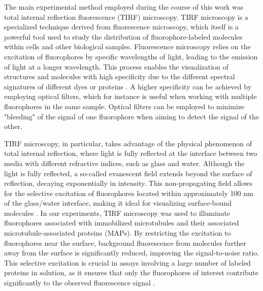 The main experimental method employed during the course of this work was total internal reflection fluorescence (TIRF) microscopy. TIRF microscopy is a specialized technique derived from fluorescence microscopy, which itself is a powerful tool used to study the distribution of fluorophore-labeled molecules within cells and other biological samples. Fluorescence microscopy relies on the excitation of fluorophores by specific wavelengths of light, leading to the emission of light at a longer wavelength. This process enables the visualization of structures and molecules with high specificity due to the different spectral signatures of different dyes or proteins . A higher specificity can be achieved by employing optical filters, which for instance is useful when working with multiple fluorophores in the same sample. Optical filters can be employed to minimize "bleeding" of the signal of one fluorophore when aiming to detect the signal of the other.\par

TIRF microscopy, in particular, takes advantage of the physical phenomenon of total internal reflection, where light is fully reflected at the interface between two media with different refractive indices, such as glass and water. Although the light is fully reflected, a so-called evanescent field extends beyond the surface of reflection, decaying exponentially in intensity. This non-propagating field allows for the selective excitation of fluorophores located within approximately 100 nm of the glass/water interface, making it ideal for visualizing surface-bound molecules . In our experiments, TIRF microscopy was used to illuminate fluorophores associated with immobilized microtubules and their associated microtubule-associated proteins (MAPs). By restricting the excitation to fluorophores near the surface, background fluorescence from molecules further away from the surface is significantly reduced, improving the signal-to-noise ratio. This selective excitation is crucial in assays involving a large number of labeled proteins in solution, as it ensures that only the fluorophores of interest contribute significantly to the observed fluorescence signal .

